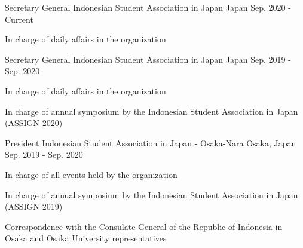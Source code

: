 

\begin{cventries}

  \cventry
  {Secretary General} %
  {Indonesian Student Association in Japan} %
  {Japan} %
  {Sep. 2020 - Current} %
  {
    \begin{cvitems} %
      \item {In charge of daily affairs in the organization}
    \end{cvitems}
  }

  \cventry
  {Secretary General} %
  {Indonesian Student Association in Japan} %
  {Japan} %
  {Sep. 2019 - Sep. 2020} %
  {
    \begin{cvitems} %
      \item {In charge of daily affairs in the organization}
      \item {In charge of annual symposium by the Indonesian Student Association in Japan (ASSIGN 2020)}
    \end{cvitems}
  }
 

  \cventry
  {President} %
  {Indonesian Student Association in Japan - Osaka-Nara} %
  {Osaka, Japan} %
  {Sep. 2019 - Sep. 2020} %
  {
    \begin{cvitems} %
      \item {In charge of all events held by the organization}
      \item {In charge of annual symposium by the Indonesian Student Association in Japan (ASSIGN 2019)}
      \item {Correspondence with the Consulate General of the Republic of Indonesia in Osaka and Osaka University representatives}
    \end{cvitems}
  }

\end{cventries}
